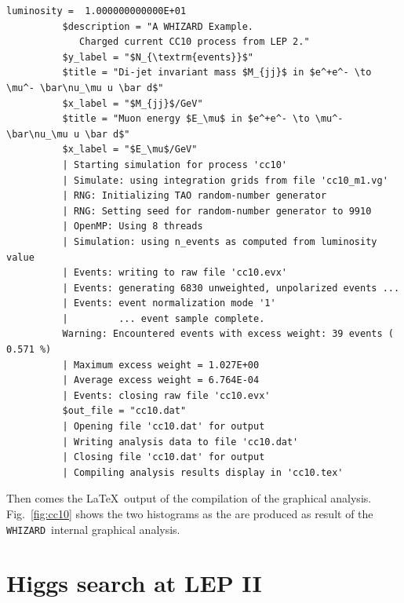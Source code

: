 \documentclass[12pt]{book}
\newcommand{\ttt}[1]{\texttt{#1}}
\newcommand{\whizard}{\ttt{WHIZARD}}
\begin{document}
\begin{scriptsize}
\begin{Verbatim}[frame=single]
          luminosity =  1.000000000000E+01
          $description = "A WHIZARD Example.
             Charged current CC10 process from LEP 2."
          $y_label = "$N_{\textrm{events}}$"
          $title = "Di-jet invariant mass $M_{jj}$ in $e^+e^- \to \mu^- \bar\nu_\mu u \bar d$"
          $x_label = "$M_{jj}$/GeV"
          $title = "Muon energy $E_\mu$ in $e^+e^- \to \mu^- \bar\nu_\mu u \bar d$"
          $x_label = "$E_\mu$/GeV"
          | Starting simulation for process 'cc10'
          | Simulate: using integration grids from file 'cc10_m1.vg'
          | RNG: Initializing TAO random-number generator
          | RNG: Setting seed for random-number generator to 9910
          | OpenMP: Using 8 threads
          | Simulation: using n_events as computed from luminosity value
          | Events: writing to raw file 'cc10.evx'
          | Events: generating 6830 unweighted, unpolarized events ...
          | Events: event normalization mode '1'
          |         ... event sample complete.
          Warning: Encountered events with excess weight: 39 events (  0.571 %)
          | Maximum excess weight = 1.027E+00
          | Average excess weight = 6.764E-04
          | Events: closing raw file 'cc10.evx'
          $out_file = "cc10.dat"
          | Opening file 'cc10.dat' for output
          | Writing analysis data to file 'cc10.dat'
          | Closing file 'cc10.dat' for output
          | Compiling analysis results display in 'cc10.tex'
\end{Verbatim}
\end{scriptsize} %
Then comes the \LaTeX\ output of the compilation of the graphical
analysis. Fig.~\ref{fig:cc10} shows the two histograms as the are
produced as result of the \whizard\ internal graphical analysis.


\section{Higgs search at LEP II}
\end{document}
